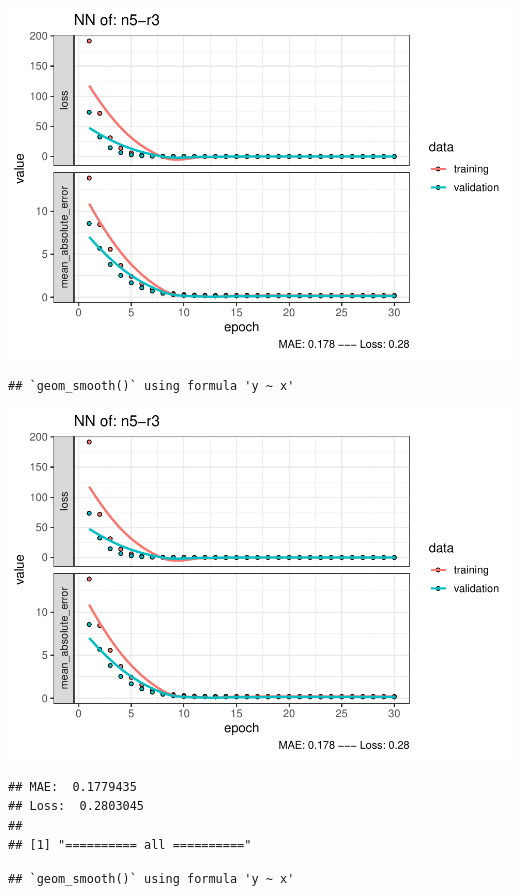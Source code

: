 \documentclass[
]{article}
\begin{document}
\includegraphics{project-code_files/figure-latex/unnamed-chunk-18-39.pdf}

\begin{verbatim}
## `geom_smooth()` using formula 'y ~ x'
\end{verbatim}

\includegraphics{project-code_files/figure-latex/unnamed-chunk-18-40.pdf}

\begin{verbatim}
## MAE:  0.1779435
## Loss:  0.2803045 
## 
## [1] "========== all =========="
\end{verbatim}

\begin{verbatim}
## `geom_smooth()` using formula 'y ~ x'
\end{verbatim}
\end{document}
